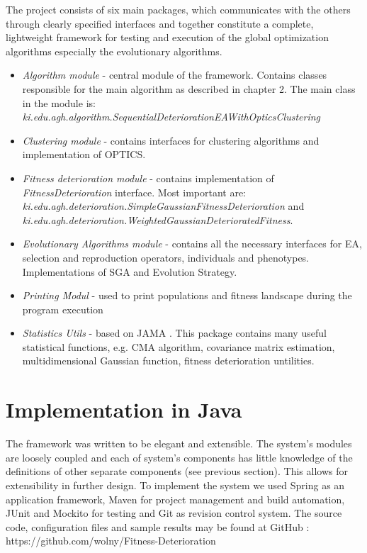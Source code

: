 The project consists of six main packages, which communicates with the
others through clearly specified interfaces and together constitute a
complete, lightweight framework for testing and execution of the global 
optimization algorithms especially the evolutionary algorithms.
\begin{itemize}
  \item \textit{Algorithm module} - central module of the framework. Contains
  classes responsible for the main algorithm as described in chapter 2.
  The main class in the module is:
  \textit{ki.edu.agh.algorithm.SequentialDeteriorationEAWithOpticsClustering}
  \item \textit{Clustering module} - contains interfaces for clustering
  algorithms and implementation of OPTICS.
  \item \textit{Fitness deterioration module} - contains implementation of
  \textit{FitnessDeterioration} interface. Most important are:
  \textit{ki.edu.agh.deterioration.SimpleGaussianFitnessDeterioration} and 
  \textit{ki.edu.agh.deterioration.WeightedGaussianDeterioratedFitness}.
  \item \textit{Evolutionary Algorithms module} - contains all the necessary
  interfaces for EA, selection and reproduction operators, individuals and
  phenotypes. Implementations of SGA and Evolution Strategy. 
  \item \textit{Printing Modul} - used to print populations and fitness
  landscape during the program execution
  \item \textit{Statistics Utils} - based on JAMA \cite{jama}. This package
  contains many useful statistical functions, e.g. CMA algorithm, covariance
  matrix estimation, multidimensional Gaussian function, fitness deterioration
  untilities.
\end{itemize}

\section{Implementation in Java}
The framework was written to be elegant and extensible. The system's 
modules are loosely coupled and each of system's components has little knowledge of the definitions 
of other separate components (see previous section). This allows for
extensibility in further design. To implement the system we used Spring
\cite{spring} as an application framework, Maven \cite{maven} for project
management and build automation, JUnit \cite{junit} and Mockito \cite{mockito}
for testing and Git \cite{git} as revision control system. 
The source code, configuration files and sample results may be found at 
GitHub \cite{github}: https://github.com/wolny/Fitness-Deterioration

